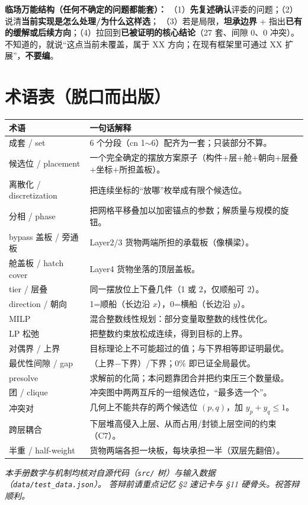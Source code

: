 \documentclass[11pt]{ctexart}
\newcommand{\code}[1]{\texttt{#1}}
\begin{document}
\begin{key}\textbf{临场万能结构（任何不确定的问题都能套）：}
（1）\textbf{先复述确认}评委的问题；（2）说清\textbf{当前实现是怎么处理/为什么这样选}；
（3）若是局限，\textbf{坦承边界} + 指出\textbf{已有的缓解或后续方向}；（4）拉回到\textbf{已被证明的核心结论}（27 套、间隙 0、0 冲突）。
不知道的，就说“这点当前未覆盖，属于 XX 方向；在现有框架里可通过 XX 扩展”，\textbf{不要编}。
\end{key}

\section{术语表（脱口而出版）}
\begin{longtable}{@{}p{3.4cm}p{11.4cm}@{}}
\toprule
术语 & 一句话解释 \\
\midrule
\endhead
成套 / set & 6 个分段（cn 1$\sim$6）配齐为一套；只装部分不算。 \\
候选位 / placement & 一个完全确定的摆放方案原子（构件+层+舱+朝向+层叠+坐标+所担盖板）。 \\
离散化 / discretization & 把连续坐标的“放哪”枚举成有限个候选位。 \\
分相 / phase & 把网格平移叠加以加密锚点的参数；解质量与规模的旋钮。 \\
bypass 盖板 / 旁通板 & Layer2/3 货物两端所担的承载板（像横梁）。 \\
舱盖板 / hatch cover & Layer4 货物坐落的顶层盖板。 \\
tier / 层叠 & 同一摆放位上下叠几件（1 或 2，仅顺船可 2）。 \\
direction / 朝向 & 1=顺船（长边沿 $x$），0=横船（长边沿 $y$）。 \\
MILP & 混合整数线性规划：部分变量取整数的线性优化。 \\
LP 松弛 & 把整数约束放松成连续，得到目标的上界。 \\
对偶界 / 上界 & 目标理论上不可能超过的值；与下界相等即证明最优。 \\
最优性间隙 / gap & （上界$-$下界）/下界；0\% 即已证全局最优。 \\
presolve & 求解前的化简；本问题靠团合并把约束压三个数量级。 \\
团 / clique & 冲突图中两两互斥的一组候选位，“最多选一个”。 \\
冲突对 & 几何上不能共存的两个候选位 $(p,q)$，加 $y_p+y_q\le1$。 \\
跨层耦合 & 下层堆高侵入上层、从而占用/封锁上层空间的约束（C7）。 \\
半重 / half-weight & 货物两端各担一块板，每块承担一半（双层先翻倍）。 \\
\bottomrule
\end{longtable}

\vfill
\begin{center}\small\itshape
本手册数字与机制均核对自源代码（\code{src/} 树）与输入数据（\code{data/test\_data.json}）。
答辩前请重点记忆 \S2 速记卡与 \S11 硬骨头。祝答辩顺利。
\end{center}
\end{document}
